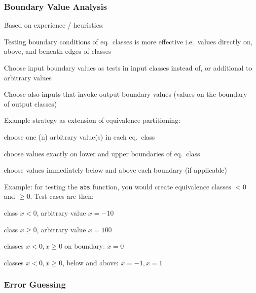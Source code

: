 
\subsubsection{Boundary Value Analysis}

Based on experience / heuristics:
\begin{itemize*}
\item Testing boundary conditions of eq.\ classes is more effective i.e.\ values directly on, above, and beneath edges of classes
\item Choose input boundary values as tests in input classes instead of, or additional to arbitrary values
\item Choose also inputs that invoke output boundary values (values on the boundary of output classes)
\item Example strategy as extension of equivalence partitioning:
\begin{itemize*}
	\item choose one (n) arbitrary value(s) in each eq.\ class %
	\item choose values exactly on lower and upper boundaries of eq.\ class
	\item choose values immediately below and above each boundary (if applicable)
\end{itemize*}
\end{itemize*}

Example: for testing the \verb|abs| function, you would create equivalence classes $<0$ and $\geq 0$. Test cases are then:
\begin{itemize*}
    \item class $x<0$, arbitrary value $x = -10$
    \item class $x \geq 0$, arbitrary value $x = 100$
    \item classes $x<0, x\geq 0$ on boundary: $x=0$
    \item classes $x<0, x \geq 0$, below and above: $x=-1, x=1$
\end{itemize*}

\subsubsection{Error Guessing}


